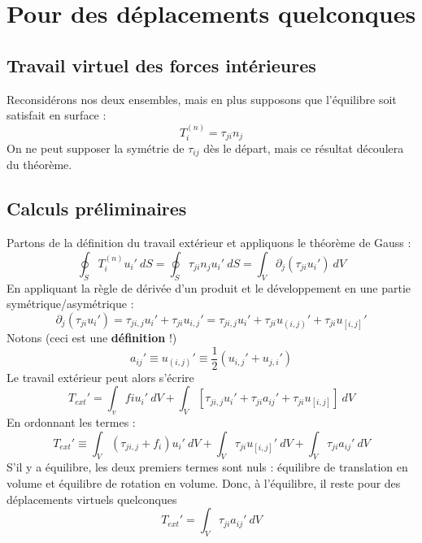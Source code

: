 \section{Pour des déplacements quelconques}
	\subsection{Travail virtuel des forces intérieures}
	Reconsidérons nos deux ensembles, mais en plus supposons que l'équilibre soit 
	satisfait en surface :
	\begin{equation}
	T_i^{(n)} = \tau_{ji}n_j
	\end{equation}
	\danger On ne peut supposer la symétrie de $\tau_{ij}$ dès le départ, mais 
	ce résultat découlera du théorème.
	
	\subsection{Calculs préliminaires}
	Partons de la définition du travail extérieur et appliquons le théorème de 
	Gauss :
	\begin{equation}
	\oint_S T_i^{(n)}u_i'\ dS = \oint_S \tau_{ji}n_ju_i'\ dS = \int_V \partial_j
	(\tau_{ji}u_i')\ dV
	\end{equation}
	En appliquant la règle de dérivée d'un produit et le développement en une 
	partie symétrique/asymétrique :
	\begin{equation}
	\partial_j(\tau_{ji}u_i') = \tau_{ji,j}u_i'+\tau_{ji}u_{i,j}' = \tau_{ji,j}
	u_i' + \tau_{ji}u_{(i,j)}'+\tau_{ji}u_{[i,j]}'
	\end{equation}
	Notons (ceci est une \textbf{définition} !)
	\begin{equation}
	a_{ij}' \equiv u_{(i,j)}' \equiv \dfrac{1}{2}(u_{i,j}'+u_{j,i}')
	\end{equation}
	Le travail extérieur peut alors s'écrire
	\begin{equation}
	T_{ext}' = \int_v fiu_i'\ dV + \int_V [\tau_{ji,j}u_i'+\tau_{ji}a_{ij}'+
	\tau_{ji}u_{[i,j]}]\ dV
	\end{equation}
	En ordonnant les termes :
	\begin{equation}
	T_{ext}' \equiv \int_V(\tau_{ji,j}+f_i)u_i'\ dV + \int_V\tau_{ji}u_{[i,j]}'\ 
	dV + \int_V\tau_{ji}a_{ij}'\ dV
	\end{equation}
	S'il y a équilibre, les deux premiers termes sont nuls : équilibre de 
	translation en volume et équilibre de rotation en volume. Donc, à 
	l'équilibre, il reste pour des déplacements virtuels quelconques 
	\begin{equation}
	T_{ext}' = \int_V \tau_{ji}a_{ij}'\ dV
	\end{equation}
